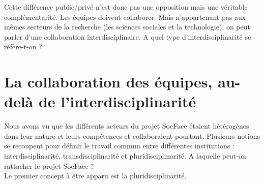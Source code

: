 Cette différence public/privé n’est donc pas une opposition mais une véritable complémentarité. Les équipes doivent collaborer. Mais n’appartenant pas aux mêmes secteurs de la recherche (les sciences sociales et la technologie), on peut parler d’une collaboration interdisciplinaire. A quel type d’interdisciplinarité se réfère-t-on ?

    \section{La collaboration des équipes, au-delà de l'interdisciplinarité}

Nous avons vu que les différents acteurs du projet SocFace étaient hétérogènes dans leur nature et leurs compétences et collaboraient pourtant. Plusieurs notions se recoupent pour définir le travail commun entre différentes institutions : interdisciplinarité, transdisciplinarité et pluridisciplinarité. A laquelle peut-on rattacher le projet SocFace ?\\

Le premier concept à être apparu est la pluridisciplinarité. 

